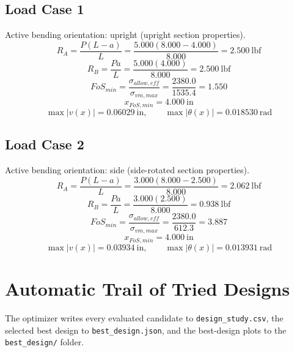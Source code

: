 \documentclass[11pt]{article}
\begin{document}
\subsection*{Load Case 1}
Active bending orientation: upright (upright section properties).
\[R_A = \frac{P(L-a)}{L} = \frac{5.000(8.000-4.000)}{8.000} = 2.500\ \mathrm{lbf}\]
\[R_B = \frac{Pa}{L} = \frac{5.000(4.000)}{8.000} = 2.500\ \mathrm{lbf}\]
\[FoS_{min} = \frac{\sigma_{allow,eff}}{\sigma_{vm,max}} = \frac{2380.0}{1535.4} = 1.550\]
\[x_{FoS,min} = 4.000\ \mathrm{in}\]
\[\max |v(x)| = 0.06029\ \mathrm{in}, \qquad \max |\theta(x)| = 0.018530\ \mathrm{rad}\]
\subsection*{Load Case 2}
Active bending orientation: side (side-rotated section properties).
\[R_A = \frac{P(L-a)}{L} = \frac{3.000(8.000-2.500)}{8.000} = 2.062\ \mathrm{lbf}\]
\[R_B = \frac{Pa}{L} = \frac{3.000(2.500)}{8.000} = 0.938\ \mathrm{lbf}\]
\[FoS_{min} = \frac{\sigma_{allow,eff}}{\sigma_{vm,max}} = \frac{2380.0}{612.3} = 3.887\]
\[x_{FoS,min} = 4.000\ \mathrm{in}\]
\[\max |v(x)| = 0.03934\ \mathrm{in}, \qquad \max |\theta(x)| = 0.013931\ \mathrm{rad}\]

\section*{Automatic Trail of Tried Designs}
The optimizer writes every evaluated candidate to \texttt{design\_study.csv}, the selected best design to \texttt{best\_design.json}, and the best-design plots to the \texttt{best\_design/} folder.
\end{document}
